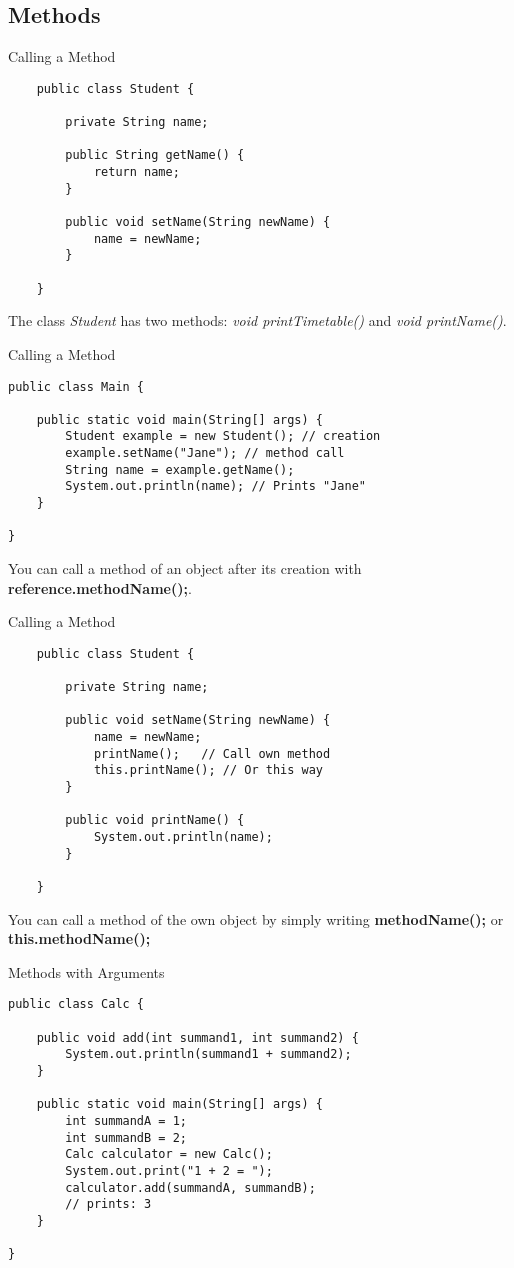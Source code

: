 \subsection{Methods}
\begin{frame}[fragile]{Calling a Method}
	\begin{lstlisting}
	public class Student {
    
		private String name;
	
		public String getName() {
        	return name;
    	}
		
	    public void setName(String newName) {
			name = newName;
	    }
	   
	}
	\end{lstlisting}
	The class \emph{Student} has two methods: \emph{void printTimetable()} and \emph{void printName()}.
\end{frame}

\begin{frame}[fragile]{Calling a Method}
\begin{lstlisting}
public class Main {

    public static void main(String[] args) {
        Student example = new Student(); // creation
        example.setName("Jane"); // method call
        String name = example.getName(); 
		System.out.println(name); // Prints "Jane"
    }
    
}
	\end{lstlisting}
	You can call a method of an object after its creation with \textbf{reference.methodName();}.
\end{frame}

\begin{frame}[fragile]{Calling a Method}
\begin{lstlisting}
	public class Student {
    
		private String name;
	
	    public void setName(String newName) {
			name = newName;
			printName();   // Call own method
			this.printName(); // Or this way
	    }
	    
	    public void printName() {
	        System.out.println(name);
	    }
        
	}
	\end{lstlisting}
	You can call a method of the own object by simply writing \textbf{methodName();} or \textbf{this.methodName();}
\end{frame}

\begin{frame}[fragile]{Methods with Arguments}

\begin{lstlisting}
public class Calc {

    public void add(int summand1, int summand2) {
        System.out.println(summand1 + summand2);
    }
	    
    public static void main(String[] args) {
        int summandA = 1;
        int summandB = 2;
        Calc calculator = new Calc();
        System.out.print("1 + 2 = ");
        calculator.add(summandA, summandB); 
		// prints: 3
    }
    
}
	\end{lstlisting}
\end{frame}

